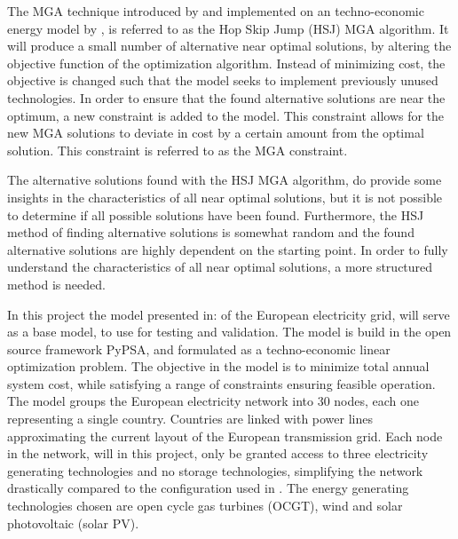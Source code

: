 The MGA technique introduced by \cite{Brill_MGA_1982} and implemented on an techno-economic energy model by \cite{DeCarolis_MGA}, is referred to as the Hop Skip Jump (HSJ) MGA algorithm. It will produce a small number of alternative near optimal solutions, by altering the objective function of the optimization algorithm. Instead of minimizing cost, the objective is changed such that the model seeks to implement previously unused technologies. In order to ensure that the found alternative solutions are near the optimum, a new constraint is added to the model. This constraint allows for the new MGA solutions to deviate in cost by a certain amount from the optimal solution. This constraint is referred to as the MGA constraint. 

The alternative solutions found with the HSJ MGA algorithm, do provide some insights in the characteristics of all near optimal solutions, but it is not possible to determine if all possible solutions have been found. 
Furthermore, the HSJ method of finding alternative  solutions is somewhat random and the found alternative solutions are highly dependent on the starting point. In order to fully understand the characteristics of all near optimal solutions, a more structured method is needed.  


In this project the model presented in: \cite{PyPSA_euro_30_model} of the European electricity grid, will serve as a base model, to use for testing and validation. The model is build in the open source framework PyPSA\cite{Pypsa}, and formulated as a techno-economic linear optimization problem. The objective in the model is to minimize total annual system cost, while satisfying a range of constraints ensuring feasible operation. The model groups the European electricity network into 30 nodes, each one representing a single country. Countries are linked with power lines approximating the current layout of the European transmission grid. Each node in the network, will in this project, only be granted access to three electricity generating technologies and no storage technologies, simplifying the network drastically compared to the configuration used in \cite{PyPSA_euro_30_model}. The energy generating technologies chosen are open cycle gas turbines (OCGT), wind and solar photovoltaic (solar PV).



